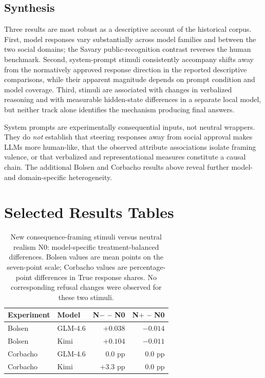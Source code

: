 \documentclass[14pt,a4paper]{extarticle}
\begin{document}
\subsection{Synthesis}

Three results are most robust as a descriptive account of the historical corpus. First, model responses vary substantially across model families and between the two social domains; the Savary public-recognition contrast reverses the human benchmark. Second, system-prompt stimuli consistently accompany shifts away from the normatively approved response direction in the reported descriptive comparisons, while their apparent magnitude depends on prompt condition and model coverage. Third, stimuli are associated with changes in verbalized reasoning and with measurable hidden-state differences in a separate local model, but neither track alone identifies the mechanism producing final answers.

System prompts are experimentally consequential inputs, not neutral wrappers. They do \emph{not} establish that steering responses away from social approval makes LLMs more human-like, that the observed attribute associations isolate framing valence, or that verbalized and representational measures constitute a causal chain. The additional Bolsen and Corbacho results above reveal further model- and domain-specific heterogeneity.


\section{Selected Results Tables}

\begin{table}[htbp]
\centering
\caption{New consequence-framing stimuli versus neutral realism N0: model-specific treatment-balanced differences. Bolsen values are mean points on the seven-point scale; Corbacho values are percentage-point differences in True response shares. No corresponding refusal changes were observed for these two stimuli.}
\label{tab:new-consequence-stimuli}
\begin{tabular}{llrr}
\toprule
\textbf{Experiment} & \textbf{Model} & \textbf{N$-$ -- N0} & \textbf{N$+$ -- N0}\\
\midrule
Bolsen & GLM-4.6 & $+0.038$ & $-0.014$\\
Bolsen & Kimi & $+0.104$ & $-0.011$\\
Corbacho & GLM-4.6 & $0.0$ pp & $0.0$ pp\\
Corbacho & Kimi & $+3.3$ pp & $0.0$ pp\\
\bottomrule
\end{tabular}
\end{table}
\end{document}
